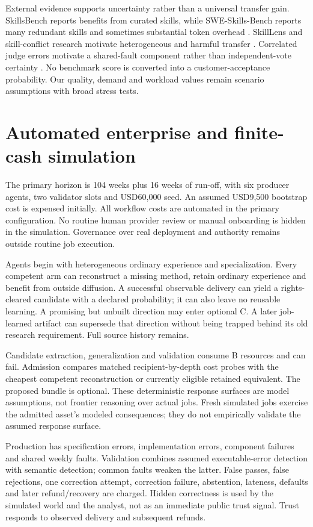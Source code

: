 \documentclass[11pt,letterpaper]{article}
\begin{document}
External evidence supports uncertainty rather than a universal transfer gain.
SkillsBench reports benefits from curated skills, while SWE-Skills-Bench reports
many redundant skills and sometimes substantial token overhead
\citep{skillsbench,swe-skills}. SkillLens and skill-conflict research motivate
heterogeneous and harmful transfer \citep{skilllens,skill-conflict}. Correlated
judge errors motivate a shared-fault component rather than independent-vote
certainty \citep{judge-correlation}. No benchmark score is converted into a
customer-acceptance probability. Our quality, demand and workload values remain
scenario assumptions with broad stress tests.

\section{Automated enterprise and finite-cash simulation}

The primary horizon is 104 weeks plus 16 weeks of run-off, with six producer
agents, two validator slots and USD60,000 seed. An assumed USD9,500 bootstrap
cost is expensed initially. All workflow costs are automated in the primary
configuration. No routine human provider review or manual onboarding is hidden
in the simulation. Governance over real deployment and authority remains outside
routine job execution.

Agents begin with heterogeneous ordinary experience and specialization. Every
competent arm can reconstruct a missing method, retain ordinary experience and
benefit from outside diffusion. A successful observable delivery can yield a
rights-cleared candidate with a declared probability; it can also leave no
reusable learning. A promising but unbuilt direction may enter optional C. A
later job-learned artifact can supersede that direction without being trapped
behind its old research requirement. Full source history remains.

Candidate extraction, generalization and validation consume B resources and can
fail. Admission compares matched recipient-by-depth cost probes with the
cheapest competent reconstruction or currently eligible retained equivalent.
The proposed bundle is optional. These deterministic response surfaces are
model assumptions, not frontier reasoning over actual jobs. Fresh simulated
jobs exercise the admitted asset's modeled consequences; they do not empirically
validate the assumed response surface.

Production has specification errors, implementation errors, component failures
and shared weekly faults. Validation combines assumed executable-error detection
with semantic detection; common faults weaken the latter. False passes, false
rejections, one correction attempt, correction failure, abstention, lateness,
defaults and later refund/recovery are charged. Hidden correctness is used by the
simulated world and the analyst, not as an immediate public trust signal.
Trust responds to observed delivery and subsequent refunds.
\end{document}

